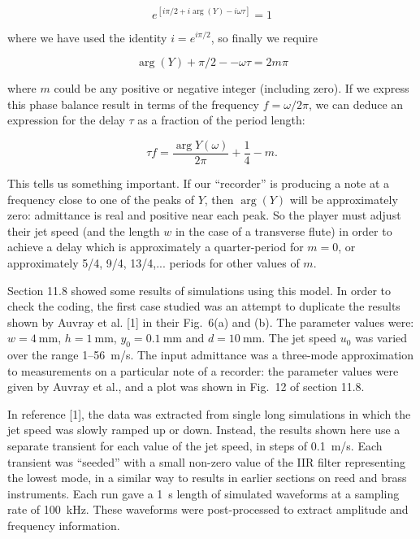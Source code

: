   \begin{equation*}e^{[i \pi/2 +i \arg(Y) -i \omega \tau]} = 1 
  \tag{19}\end{equation*} 

  \noindent{}where we have used the identity $i = e^{i \pi/2}$, so finally we 
  require 

  \begin{equation*}\arg(Y) + \pi/2 -- \omega \tau = 2m \pi 
  \tag{20}\end{equation*} 

  \noindent{}where $m$ could be any positive or negative integer (including 
  zero). If we express this phase balance result in terms of the frequency 
  $f=\omega/2 \pi$, we can deduce an expression for the delay $\tau$ as a 
  fraction of the period length: 

  \begin{equation*}\tau f= \dfrac{\arg Y(\omega)}{2 \pi} + \dfrac{1}{4} -m . 
  \tag{21}\end{equation*} 

  This tells us something important. If our ``recorder'' is producing a note at 
  a frequency close to one of the peaks of $Y$, then $\arg (Y)$ will be 
  approximately zero: admittance is real and positive near each peak. So the 
  player must adjust their jet speed (and the length $w$ in the case of a 
  transverse flute) in order to achieve a delay which is approximately a 
  quarter-period for $m=0$, or approximately 5/4, 9/4, 13/4,... periods for 
  other values of $m$. 

  Section 11.8 showed some results of simulations using this model. In order to 
  check the coding, the first case studied was an attempt to duplicate the 
  results shown by Auvray et al. [1] in their Fig.\ 6(a) and (b). The parameter 
  values were: $w=4 \mathrm{~mm}$, $h=1 \mathrm{~mm}$, $y_0=0.1 \mathrm{~mm}$ 
  and $d=10 \mathrm{~mm}$. The jet speed $u_0$ was varied over the range 
  1--56~m/s. The input admittance was a three-mode approximation to 
  measurements on a particular note of a recorder: the parameter values were 
  given by Auvray et al., and a plot was shown in Fig.\ 12 of section 11.8. 

  In reference [1], the data was extracted from single long simulations in 
  which the jet speed was slowly ramped up or down. Instead, the results shown 
  here use a separate transient for each value of the jet speed, in steps of 
  0.1~m/s. Each transient was ``seeded'' with a small non-zero value of the IIR 
  filter representing the lowest mode, in a similar way to results in earlier 
  sections on reed and brass instruments. Each run gave a 1~s length of 
  simulated waveforms at a sampling rate of 100~kHz. These waveforms were 
  post-processed to extract amplitude and frequency information. 

